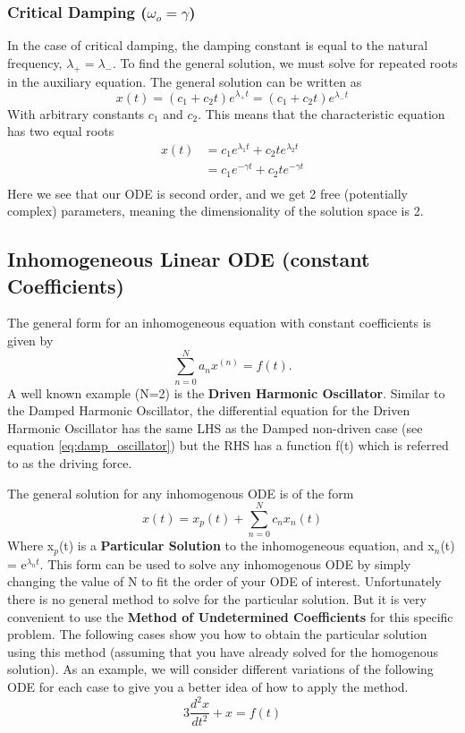 \documentclass{article}
\newcommand{\be}{\begin{equation}}
\newcommand{\ee}{\end{equation}}
\begin{document}
\subsubsection*{Critical Damping ($\omega_o = \gamma$)}
In the case of critical damping, the damping constant is equal to the natural frequency, $\lambda_+ = \lambda_-$.
To find the general solution, we must solve for repeated roots in the auxiliary equation.
The general solution can be written as
\be
x(t) = (c_1 + c_2t)e^{\lambda_+ t} = (c_1 + c_2t)e^{\lambda_- t}
\ee
With arbitrary constants $c_1$ and $c_2$.
This means that the characteristic equation has two equal roots
\be
\begin{split}
x(t) &= c_1 e^{\lambda_1 t} + c_2 te^{\lambda_2 t}\\
&= c_1 e^{-\gamma t} + c_2 te^{-\gamma t}\\
\end{split}
\ee
Here we see that our ODE is second order, and we get 2 free (potentially complex) parameters, meaning the dimensionality of the solution space is 2.

\subsection*{Inhomogeneous Linear ODE (constant Coefficients)}
The general form for an inhomogeneous equation with constant coefficients is given by
\be \label{eq:und_coeff_ex}
	\sum_{n=0}^N a_n x^{(n)} = f(t) .
\ee
A well known example (N=2) is the \textbf{Driven Harmonic Oscillator}.
Similar to the Damped Harmonic Oscillator, the differential equation for the Driven Harmonic Oscillator has the same LHS as the Damped non-driven case (see equation \ref{eq:damp_oscillator}) but the RHS has a function f(t) which is referred to as the driving force.

The general solution for any inhomogenous ODE is of the form
\be
x(t) = x_p(t) + \sum_{n=0}^N c_nx_n(t)
\ee
Where x$_p$(t) is a \textbf{Particular Solution} to the inhomogeneous equation, and x$_n$(t) = e$^{\lambda_n t}$.
This form can be used to solve any inhomogenous ODE by simply changing the value of N to fit the order of your ODE of interest.
Unfortunately there is no general method to solve for the particular solution.
But it is very convenient to use the \textbf{Method of Undetermined Coefficients} for this specific problem.
The following cases show you how to obtain the particular solution using this method (assuming that you have already solved for the homogenous solution).
As an example, we will consider different variations of the following ODE for each case to give you a better idea of how to apply the method.
\be
3 \frac{d^2 x}{dt^2} + x = f(t)
\ee
\end{document}
